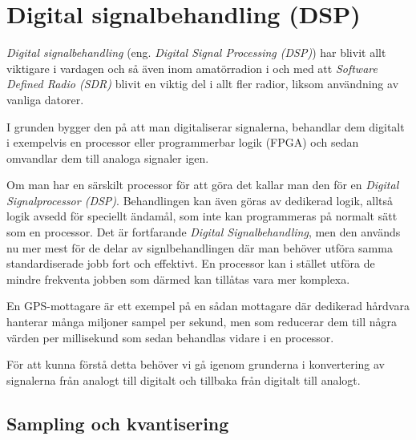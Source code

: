 \section{Digital signalbehandling (DSP)}
\label{DSP}
\label{digital_signalbehandling}

\emph{Digital signalbehandling} (eng. \emph{Digital Signal Processing (DSP)})
har blivit allt viktigare i vardagen och så även inom amatörradion i och med
att \emph{Software Defined Radio (SDR)} blivit en viktig del i allt fler
radior, liksom användning av vanliga datorer.

I grunden bygger den på att man digitaliserar signalerna, behandlar dem
digitalt i exempelvis en processor eller programmerbar logik (FPGA) och sedan
omvandlar dem till analoga signaler igen.

Om man har en särskilt processor för att göra det kallar man den för en
\emph{Digital Signalprocessor (DSP)}.
Behandlingen kan även göras av dedikerad logik, alltså logik avsedd för speciellt
ändamål, som inte kan programmeras på normalt sätt som en processor. Det är fortfarande
\emph{Digital Signalbehandling}, men den används nu mer mest för de delar av
signlbehandlingen där man behöver utföra samma standardiserade jobb fort och
effektivt.
En processor kan i stället utföra de mindre frekventa jobben som därmed kan
tillåtas vara mer komplexa.

En GPS-mottagare är ett exempel på en sådan mottagare där dedikerad hårdvara
hanterar många miljoner sampel per sekund, men som reducerar dem till några värden
per millisekund som sedan behandlas vidare i en processor.

För att kunna förstå detta behöver vi gå igenom grunderna i konvertering av
signalerna från analogt till digitalt och tillbaka från digitalt till analogt.

\subsection{Sampling och kvantisering}
\label{sampling}

